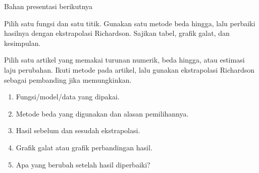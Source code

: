 \documentclass[aspectratio=169,10pt]{beamer}
\begin{document}
\begin{frame}{Bahan presentasi berikutnya}
\scriptsize
\begin{bluebox}
Pilih satu fungsi dan satu titik. Gunakan satu metode beda hingga, lalu perbaiki hasilnya dengan ekstrapolasi Richardson. Sajikan tabel, grafik galat, dan kesimpulan.
\end{bluebox}
\begin{orangebox}
Pilih satu artikel yang memakai turunan numerik, beda hingga, atau estimasi laju perubahan. Ikuti metode pada artikel, lalu gunakan ekstrapolasi Richardson sebagai pembanding jika memungkinkan.
\end{orangebox}
\begin{greenbox}
\begin{enumerate}\setlength\itemsep{2pt}
\item Fungsi/model/data yang dipakai.
\item Metode beda yang digunakan dan alasan pemilihannya.
\item Hasil sebelum dan sesudah ekstrapolasi.
\item Grafik galat atau grafik perbandingan hasil.
\item Apa yang berubah setelah hasil diperbaiki?
\end{enumerate}
\end{greenbox}
\end{frame}
\end{document}
